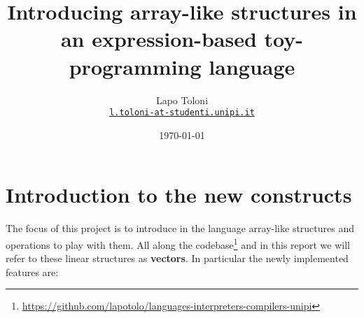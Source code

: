\documentclass[11pt]{article}
\title{Introducing array-like structures in an expression-based toy-programming language}
\author{Lapo Toloni \\%
    \href{l.toloni-at-studenti.unipi.it}{\texttt{l.toloni-at-studenti.unipi.it}}}
\date{\today}
\begin{document}
\maketitle


\section{Introduction to the new constructs}
The focus of this project is to introduce in the language array-like structures and operations to play with them. All along the codebase\footnote{\href{}{https://github.com/lapotolo/languages-interpreters-compilers-unipi}} 
and in this report we will refer to these linear structures as \textbf{vectors}. In particular the newly implemented features are:
\end{document}
